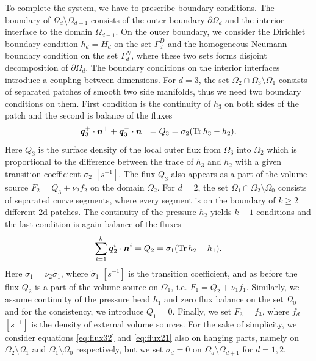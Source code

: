\documentclass[times]{nlaauth}%
\def\Tr{{\rm Tr}}
\def\vc#1{\mathbf{\boldsymbol{#1}}}     %
\def\prtl{\partial}                                        %
\begin{document}
To complete the system, we have to prescribe boundary conditions. The boundary of $\Omega_d\setminus\Omega_{d-1}$ 
consists of the outer boundary $\prtl\Omega_d$ and
the interior interface to the domain $\Omega_{d-1}$. On the outer boundary, we consider the Dirichlet boundary condition $h_d=H_d$ 
on the set $\Gamma_d^D$ and the homogeneous Neumann 
boundary condition on the set $\Gamma_d^N$, where these two sets forms disjoint decomposition of $\prtl\Omega_d$. 
The boundary conditions on the interior interfaces introduce a coupling between dimensions. 
For $d=3$, the set $\Omega_2\cap\Omega_3 \setminus \Omega_1$ consists of separated patches of smooth two side manifolds,
 thus we need two boundary conditions on them.
First condition is the continuity of $h_3$ on both sides of the patch and the second is balance of the fluxes
\begin{equation}
  \label{eq:flux32}             
  \vc{q}_3^+ \cdot \vc n^+ + \vc{q}_3^- \cdot \vc n^- = Q_{3} = \sigma_{2}(\Tr\, h_3 - h_2).
\end{equation}
Here $Q_3$ is the surface density of the local outer flux from $\Omega_3$ into $\Omega_2$ which is proportional to the difference between
the trace of $h_3$ and $h_2$ with a given transition coefficient $\sigma_2$ $[s^{-1}]$. The flux $Q_3$ also appears as a part of 
the volume source $F_2 = Q_{3} +\nu_2 f_2$ on the domain $\Omega_2$. For $d=2$, the set $\Omega_1\cap\Omega_2 \setminus \Omega_0$ 
consists of separated curve segments, where every segment is  
on the boundary of $k\ge2$ different 2d-patches. The continuity of the pressure $h_2$ yields $k-1$ conditions 
and the last condition is again balance of the fluxes
\begin{equation}
  \label{eq:flux21}
  \sum_{i=1}^{k} \vc{q}_2^i \cdot \vc n^i = Q_{2} = \sigma_{1}(\Tr\, h_2 - h_1).
\end{equation}
Here $\sigma_1=\nu_2 \tilde\sigma_1$, where $\tilde\sigma_1$ $[s^{-1}]$ is the transition coefficient,  and
as before the flux $Q_{2}$ is a part of the volume source on $\Omega_1$, i.e. $F_1 = Q_{2} +\nu_1 f_1$. 
Similarly, we assume continuity of the pressure head $h_1$ and zero flux balance on the set $\Omega_0$ 
and for the consistency, we introduce $Q_1=0$.
Finally, we set $F_3=f_3$, where $f_d$ $[s^{-1}]$ is the density of external volume sources. For the sake of simplicity, we consider
equations \eqref{eq:flux32} and \eqref{eq:flux21} also on hanging parts, namely on $\Omega_2\setminus\Omega_1$ and $\Omega_1\setminus\Omega_0$ respectively,
but we set $\sigma_{d}=0$ on $\Omega_d\setminus\Omega_{d+1}$ for $d=1,2$.
\end{document}
